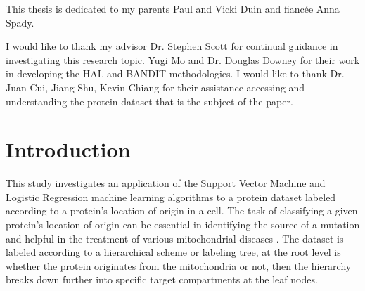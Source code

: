 \documentclass[ms]{nuthesis}
\begin{document}
\begin{dedication}
  This thesis is dedicated to my parents Paul and Vicki Duin and fianc\'{e}e Anna Spady.
\end{dedication}

\begin{acknowledgments}
  I would like to thank my advisor Dr. Stephen Scott for continual guidance in investigating this
  research topic. Yugi Mo and Dr. Douglas Downey for their work in developing the HAL and
  BANDIT methodologies. I would like to thank Dr. Juan Cui, Jiang Shu,
  Kevin Chiang for their assistance accessing and understanding the protein dataset that is
  the subject of the paper.
\end{acknowledgments}


{\small \tableofcontents}

\mainmatter

\chapter{Introduction}
This study investigates an application of the Support Vector Machine
and Logistic Regression machine learning algorithms to a protein dataset labeled
according to a protein's location of origin in a cell. The task of classifying
a given protein's location of origin can be essential in identifying the
source of a mutation and helpful in the treatment of various mitochondrial
diseases \cite{bioPoster}.
The dataset is labeled
according to a hierarchical scheme or labeling tree,
at the root level is whether the protein
 originates from the
mitochondria
or not, then the hierarchy breaks down further into specific target
compartments at the leaf nodes.
\end{document}
